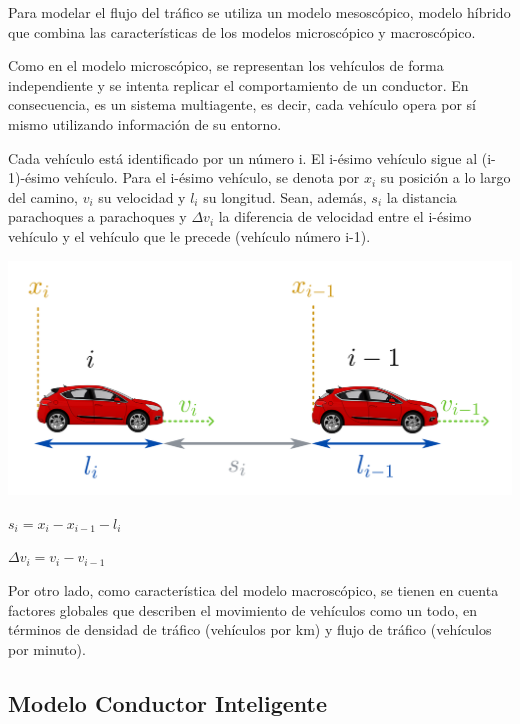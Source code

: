 \documentclass[colorinlistoftodos,twoside,twocolumn]{article} %
\begin{document}
	Para modelar el flujo del tráfico se utiliza un modelo mesosc\'opico, modelo híbrido que combina las características de los modelos microscópico y macroscópico.
	
	Como en el modelo microsc\'opico, se representan los vehículos de forma independiente y se intenta replicar el comportamiento de un conductor. En consecuencia, es un sistema multiagente, es decir, cada vehículo opera por sí mismo utilizando información de su entorno.
	
	Cada vehículo est\'a identificado por un número i. El i-ésimo vehículo sigue al (i-1)-ésimo vehículo. Para el i-ésimo vehículo, se denota por $ x_{i} $ su posición a lo largo del camino, $ v_{i} $ su velocidad y $ l_{i} $ su longitud. Sean, adem\'as, $ s_{i} $ la distancia parachoques a parachoques y $ \Delta v_{i} $ la diferencia de velocidad entre el i-ésimo vehículo y el vehículo que le precede (vehículo número i-1).
	
	\begin{center}
		\includegraphics[width=\columnwidth]{microscopic_model.png}
	\end{center}
	
	\begin{center}
		$ s_{i} = x_{i} - x_{i-1} - l_{i} $
	
		$ \Delta v_{i} = v_{i} - v_{i-1} $
	\end{center}
	
	Por otro lado, como caracter\'istica del modelo macrosc\'opico, se tienen en cuenta factores globales que describen el movimiento de vehículos como un todo, en términos de densidad de tráfico (vehículos por km) y flujo de tráfico (vehículos por minuto).
	
	
	\subsection{Modelo Conductor Inteligente}
	
\end{document}
